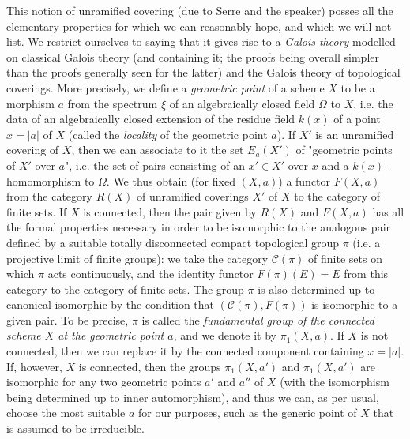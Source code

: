   This notion of unramified covering (due to Serre and the speaker) posses all the elementary properties for which we can reasonably hope, and which we will not list.
  We restrict ourselves to saying that it gives rise to a \emph{Galois theory} modelled on classical Galois theory (and containing it; the proofs being overall simpler than the proofs generally seen for the latter) and the Galois theory of topological coverings.
  More precisely, we define a \emph{geometric point} of a scheme \(X\) to be a morphism \(a\) from the spectrum \(\xi \) of an algebraically closed field \(\Omega \) to \(X\), i.e. the data of an algebraically closed extension of the residue field \(k(x)\) of a point \(x=|a|\) of \(X\) (called the \emph{locality} of the geometric point \(a\)).
  If \(X'\) is an unramified covering of \(X\), then we can associate to it the set \(E_a(X')\) of "geometric points of \(X'\) over \(a\)", i.e. the set of pairs consisting of an \(x'\in  X'\) over \(x\) and a \(k(x)\)-homomorphism to \(\Omega \).
  We thus obtain (for fixed \((X,a)\)) a functor \(F(X,a)\) from the category \(R(X)\) of unramified coverings \(X'\) of \(X\) to the category of finite sets.
  If \(X\) is connected, then the pair given by \(R(X)\) and \(F(X,a)\) has all the formal properties necessary in order to be isomorphic to the analogous pair defined by a suitable totally disconnected compact topological group \(\pi \) (i.e. a projective limit of finite groups): we take the category \(\mathcal {C}(\pi )\) of finite sets on which \(\pi \) acts continuously, and the identity functor \(F(\pi )(E)=E\) from this category to the category of finite sets.
  The group \(\pi \) is also determined up to canonical isomorphic by the condition that \((\mathcal {C}(\pi ),F(\pi ))\) is isomorphic to a given pair.
  To be precise, \(\pi \) is called the \emph{fundamental group of the connected scheme \(X\) at the geometric point \(a\)}, and we denote it by \(\pi _1(X,a)\).
  If \(X\) is not connected, then we can replace it by the connected component containing \(x=|a|\).
  If, however, \(X\) is connected, then the groups \(\pi _1(X,a')\) and \(\pi _1(X,a')\) are isomorphic for any two geometric points \(a'\) and \(a''\) of \(X\) (with the isomorphism being determined up to inner automorphism), and thus we can, as per usual, choose the most suitable \(a\) for our purposes, such as the generic point of \(X\) that is assumed to be irreducible.
  
